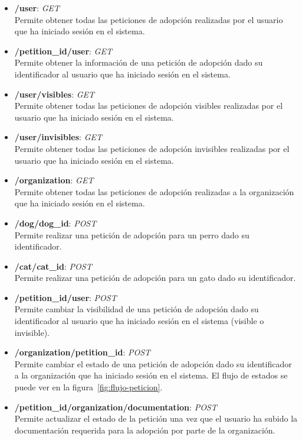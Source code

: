 \begin{itemize}
    \item \textbf{/user}: \textit{GET} \\
    Permite obtener todas las peticiones de adopción realizadas por el usuario que ha iniciado sesión en el sistema.
    \item \textbf{/{petition\_id}/user}: \textit{GET} \\
    Permite obtener la información de una petición de adopción dado su identificador al usuario que ha iniciado sesión en el sistema.
    \item \textbf{/user/visibles}: \textit{GET} \\
    Permite obtener todas las peticiones de adopción visibles realizadas por el usuario que ha iniciado sesión en el sistema.
    \item \textbf{/user/invisibles}: \textit{GET} \\
    Permite obtener todas las peticiones de adopción invisibles realizadas por el usuario que ha iniciado sesión en el sistema.
    \item \textbf{/organization}: \textit{GET} \\
    Permite obtener todas las peticiones de adopción realizadas a la organización que ha iniciado sesión en el sistema.
    \item \textbf{/dog/{dog\_id}}: \textit{POST} \\
    Permite realizar una petición de adopción para un perro dado su identificador.
    \item \textbf{/cat/{cat\_id}}: \textit{POST} \\
    Permite realizar una petición de adopción para un gato dado su identificador.
    \item \textbf{/{petition\_id}/user}: \textit{POST} \\
    Permite cambiar la visibilidad de una petición de adopción dado su identificador al usuario que ha iniciado sesión en el sistema (visible o invisible).
    \item \textbf{/organization/{petition\_id}}: \textit{POST} \\
    Permite cambiar el estado de una petición de adopción dado su identificador a la organización que ha iniciado sesión en el sistema. El flujo de estados
    se puede ver en la figura~\ref{fig:flujo-peticion}.
    \item \textbf{/{petition\_id}/organization/documentation}: \textit{POST} \\
    Permite actualizar el estado de la petición una vez que el usuario ha subido la documentación requerida para la adopción por parte de la organización.

\end{itemize}
